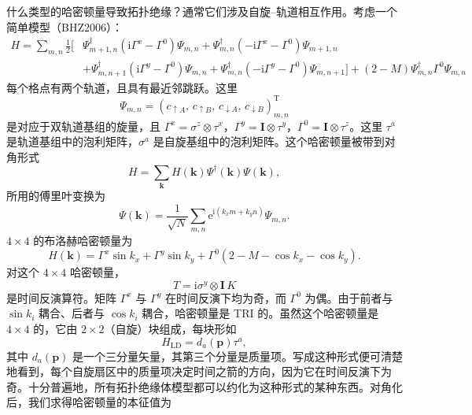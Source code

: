 什么类型的哈密顿量导致拓扑绝缘？通常它们涉及自旋--轨道相互作用。考虑一个简单模型（BHZ2006）：
\begin{align*}
H=\sum_{m,n}\frac{1}{2}\Big[&\Psi_{m+1,n}^{\dagger}(\mathrm{i}\Gamma^{x}-\Gamma^{0})\Psi_{m,n}+\Psi_{m,n}^{\dagger}(-\mathrm{i}\Gamma^{x}-\Gamma^{0})\Psi_{m+1,n}\\
&+\Psi_{m,n+1}^{\dagger}(\mathrm{i}\Gamma^{y}-\Gamma^{0})\Psi_{m,n}+\Psi_{m,n}^{\dagger}(-\mathrm{i}\Gamma^{y}-\Gamma^{0})\Psi_{m,n+1}\Big]+(2-M)\Psi_{m,n}^{\dagger}\Gamma^{0}\Psi_{m,n}\tag{15.44}
\end{align*}
每个格点有两个轨道，且具有最近邻跳跃。这里
\begin{equation*}
\Psi_{m,n}=(c_{\uparrow A},\,c_{\uparrow B},\,c_{\downarrow A},\,c_{\downarrow B})_{m,n}^{\mathrm{T}}\tag{15.45}
\end{equation*}
是对应于双轨道基组的旋量，且 $\Gamma^{x}=\sigma^{z}\otimes\tau^{x}$，$\Gamma^{y}=\mathbf{I}\otimes\tau^{y}$，$\Gamma^{0}=\mathbf{I}\otimes\tau^{z}$。这里 $\tau^{a}$ 是轨道基组中的泡利矩阵，$\sigma^{a}$ 是自旋基组中的泡利矩阵。这个哈密顿量被带到对角形式
\begin{equation*}
H=\sum_{\mathbf{k}}H(\mathbf{k})\Psi^{\dagger}(\mathbf{k})\Psi(\mathbf{k}),\tag{15.46}
\end{equation*}
所用的傅里叶变换为
\begin{equation*}
\Psi(\mathbf{k})=\frac{1}{\sqrt{N}}\sum_{m,n}\mathrm{e}^{\mathrm{i}(k_{x}m+k_{y}n)}\Psi_{m,n}.\tag{15.47}
\end{equation*}
$4\times4$ 的布洛赫哈密顿量为
\begin{equation*}
H(\mathbf{k})=\Gamma^{x}\sin k_{x}+\Gamma^{y}\sin k_{y}+\Gamma^{0}(2-M-\cos k_{x}-\cos k_{y}).\tag{15.48}
\end{equation*}
对这个 $4\times4$ 哈密顿量，
\begin{equation*}
T=\mathrm{i}\sigma^{y}\otimes\mathbf{I}\,K\tag{15.49}
\end{equation*}
是时间反演算符。矩阵 $\Gamma^{x}$ 与 $\Gamma^{y}$ 在时间反演下均为奇，而 $\Gamma^{0}$ 为偶。由于前者与 $\sin k_{i}$ 耦合、后者与 $\cos k_{i}$ 耦合，哈密顿量是 TRI 的。虽然这个哈密顿量是 $4\times4$ 的，它由 $2\times2$（自旋）块组成，每块形如
\begin{equation*}
H_{\mathrm{LD}}=d_{a}(\mathbf{p})\tau^{a},\tag{15.50}
\end{equation*}
其中 $d_{a}(\mathbf{p})$ 是一个三分量矢量，其第三个分量是质量项。写成这种形式便可清楚地看到，每个自旋扇区中的质量项决定时间之箭的方向，因为它在时间反演下为奇。十分普遍地，所有拓扑绝缘体模型都可以约化为这种形式的某种东西。对角化后，我们求得哈密顿量的本征值为
